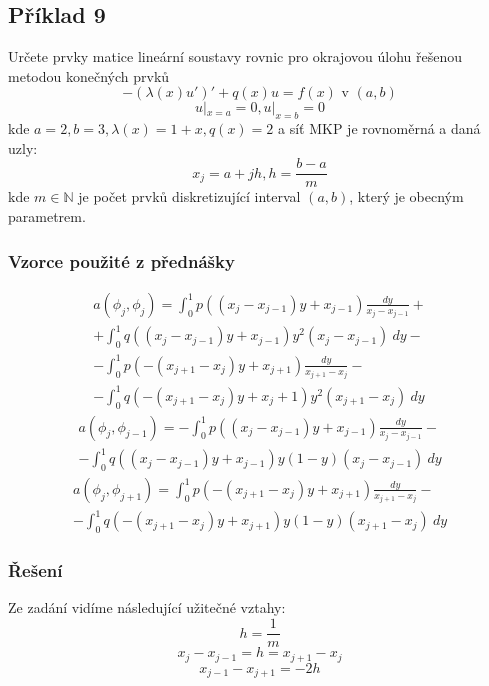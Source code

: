 \documentclass[../main.tex]{subfiles}
\begin{document}
\subsection{Příklad 9}
Určete prvky matice lineární soustavy rovnic pro okrajovou úlohu řešenou\\ metodou konečných prvků
\begin{equation}
    -(\lambda(x)u')' + q(x)u = f(x) \text{ v } (a,b)
\end{equation}
\begin{equation}
    u|_{x=a} = 0, u|_{x=b} = 0
\end{equation}
kde $a=2, b=3, \lambda(x) = 1+x, q(x)=2$ a síť MKP je rovnoměrná a daná uzly:
\begin{equation}
    x_j = a + jh, h=\frac{b-a}{m}
\end{equation}
kde $m\in \mathbb{N}$ je počet prvků diskretizující interval $(a,b)$, který je obecným parametrem.


\subsubsection{Vzorce použité z přednášky}
\begin{multline}\label{pr1:middle}
    a(\phi_j, \phi_j) = \int_0^1 p((x_j - x_{j-1})y + x_{j-1}) \frac{dy}{x_j - x_{j-1}} +\\+ \int_0^1 q((x_j - x_{j-1})y + x_{j-1}) y^2 (x_j - x_{j-1}) \ dy -\\- \int_0^1 p(-(x_{j+1} - x_j)y + x_{j+1}) \frac{dy}{ x_{j+1} - x_j} -\\- \int_0^1 q(-(x_{j+1} - x_j)y + x_j+1) y^2 (x_{j+1} - x_j) \ dy
\end{multline}
\begin{multline}\label{pr1:bellow}
    a(\phi_j, \phi_{j-1}) = - \int_0^1 p((x_j - x_{j-1})y + x_{j-1}) \frac{dy}{x_j - x_{j-1}} -\\- \int_0^1 q((x_j - x_{j-1})y + x_{j-1}) y(1-y) (x_j - x_{j-1}) \ dy
\end{multline}
\begin{multline}\label{pr1:above}
    a(\phi_j, \phi_{j+1}) = \int_0^1 p(-(x_{j+1} - x_j)y + x_{j+1}) \frac{dy}{ x_{j+1} - x_j} -\\- \int_0^1 q(-(x_{j+1} - x_j)y + x_{j+1}) y(1-y) (x_{j+1} - x_j) \ dy
\end{multline}


\subsubsection{Řešení}
Ze zadání vidíme následující užitečné vztahy:
\begin{equation}\label{pr1:vztahhm}
    h=\frac{1}{m}
\end{equation}
\begin{equation}\label{pr1:h}
    x_j - x_{j-1} = h = x_{j+1} - x_j
\end{equation}
\begin{equation}\label{pr1:-2h}
    x_{j-1}- x_{j+1} = -2h
\end{equation}
\end{document}
